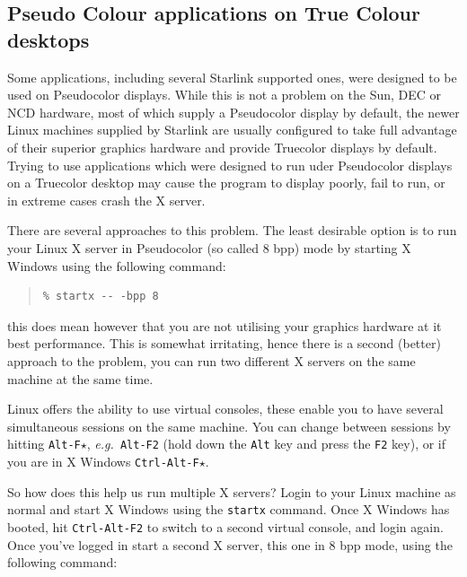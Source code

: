 \documentclass[twoside,11pt]{article}
\newcommand{\htmladdnormallink}[2]{#1}
\newcommand{\xlabel}[1]{}
\begin{document}
\subsection{\xlabel{sc15_pseudoontrue}Pseudo Colour applications on True Colour desktops\label{sc15_pseudoontrue}}

Some applications, including several Starlink supported ones, were designed to be used on Pseudocolor displays. While this is not a problem on the Sun, DEC or NCD hardware, most of which supply a Pseudocolor display by default, the newer Linux machines supplied by Starlink are usually configured to take full advantage of their superior graphics hardware and provide Truecolor displays by default. Trying to use applications which were designed to run uder Pseudocolor displays on a Truecolor desktop may cause the program to display poorly, fail to run, or in extreme cases crash the X server.

There are several approaches to this problem. The least desirable option is to run your Linux X server in Pseudocolor (so called 8 bpp) mode by starting X Windows using the following command:

\small
\begin{quote}
\begin{verbatim}
% startx -- -bpp 8
\end{verbatim}
\end{quote}
\normalsize

this does mean however that you are not utilising your graphics hardware at it best performance. This is somewhat irritating, hence there is a second (better) approach to the problem, you can run two different X servers on the same machine at the same time.

Linux offers the ability to use \htmladdnormallink{virtual consoles}{http://www.linuxdoc.org/HOWTO/Keyboard-and-Console-HOWTO-7.html}, these enable you to have several simultaneous sessions on the same machine. You can change between sessions by hitting {\tt Alt-F$\star$}, {\em e.g.\ }{\tt Alt-F2} (hold down the {\tt Alt} key and press the {\tt F2} key), or if you are in X Windows {\tt Ctrl-Alt-F$\star$}.

So how does this help us run multiple X servers? Login to your Linux machine as normal and start X Windows using the {\tt startx} command. Once X Windows has booted, hit {\tt Ctrl-Alt-F2} to switch to a second virtual console, and login again. Once you've logged in start a second X server, this one in 8 bpp mode, using the following command:
\end{document}
